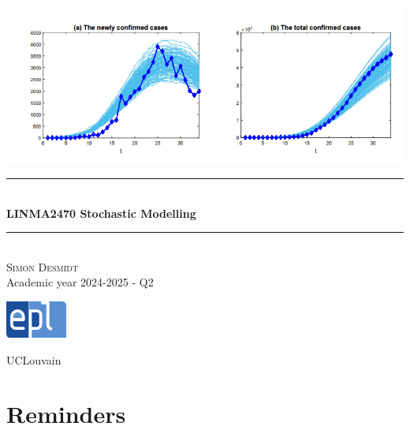 \documentclass[12pt, openany]{report}
\newcommand{\HRule}{\rule{\linewidth}{0.5mm}}
\theoremstyle{definition}
\begin{document}
\begin{titlepage}
    \begin{sffamily}
    \begin{center}
        \includegraphics[scale=0.5]{img/page_de_garde.png} \\[1cm]
        \HRule \\[0.4cm]
        { \huge \bfseries LINMA2470 Stochastic Modelling \\[0.4cm] }
    
        \HRule \\[1.5cm]
        \textsc{\LARGE Simon Desmidt}\\[1cm]
        \vfill
        \vspace{2cm}
        {\large Academic year 2024-2025 - Q2}
        \vspace{0.4cm}
         
        \includegraphics[width=0.15\textwidth]{img/epl.png}
        
        UCLouvain\\
    
    \end{center}
    \end{sffamily}
\end{titlepage}

\setcounter{tocdepth}{1}
\tableofcontents
\chapter{Reminders}
\end{document}
